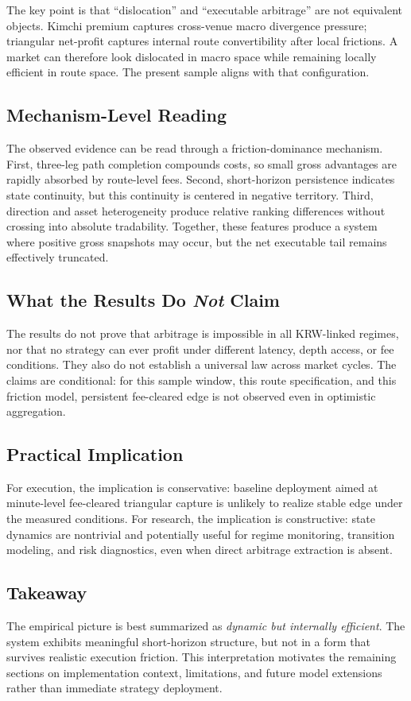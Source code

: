 \documentclass[11pt,a4paper]{article}
\begin{document}
The key point is that ``dislocation'' and ``executable arbitrage'' are not equivalent objects. Kimchi premium captures cross-venue macro divergence pressure; triangular net-profit captures internal route convertibility after local frictions. A market can therefore look dislocated in macro space while remaining locally efficient in route space. The present sample aligns with that configuration.

\subsection{Mechanism-Level Reading}
The observed evidence can be read through a friction-dominance mechanism. First, three-leg path completion compounds costs, so small gross advantages are rapidly absorbed by route-level fees. Second, short-horizon persistence indicates state continuity, but this continuity is centered in negative territory. Third, direction and asset heterogeneity produce relative ranking differences without crossing into absolute tradability. Together, these features produce a system where positive gross snapshots may occur, but the net executable tail remains effectively truncated.

\subsection{What the Results Do \emph{Not} Claim}
The results do not prove that arbitrage is impossible in all KRW-linked regimes, nor that no strategy can ever profit under different latency, depth access, or fee conditions. They also do not establish a universal law across market cycles. The claims are conditional: for this sample window, this route specification, and this friction model, persistent fee-cleared edge is not observed even in optimistic aggregation.

\subsection{Practical Implication}
For execution, the implication is conservative: baseline deployment aimed at minute-level fee-cleared triangular capture is unlikely to realize stable edge under the measured conditions. For research, the implication is constructive: state dynamics are nontrivial and potentially useful for regime monitoring, transition modeling, and risk diagnostics, even when direct arbitrage extraction is absent.

\subsection{Takeaway}
The empirical picture is best summarized as \emph{dynamic but internally efficient}. The system exhibits meaningful short-horizon structure, but not in a form that survives realistic execution friction. This interpretation motivates the remaining sections on implementation context, limitations, and future model extensions rather than immediate strategy deployment.
\end{document}
